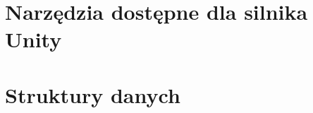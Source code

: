 \documentclass[nostrict]{Szablon}
\begin{document}









\section{Narzędzia dostępne dla silnika Unity}


\section{Struktury danych}










\end{document}
